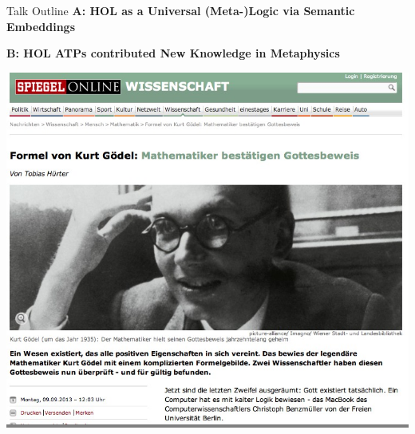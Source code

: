 \documentclass[9pt,mathserif,unknownkeysallowed,xcolor=dvipsnames]{beamer}
\begin{document}
\begin{frame}{Talk Outline}
    \textbf{A: HOL as a Universal (Meta-)Logic via Semantic Embeddings}
\vfill



    \textbf{B: HOL ATPs contributed New Knowledge in Metaphysics}

\vfill
\begin{center}
{\colorbox{gray}{\includegraphics[width=.6\textwidth]{./Images/News/spiegel1}}}
\end{center}
\end{frame}
\end{document}
